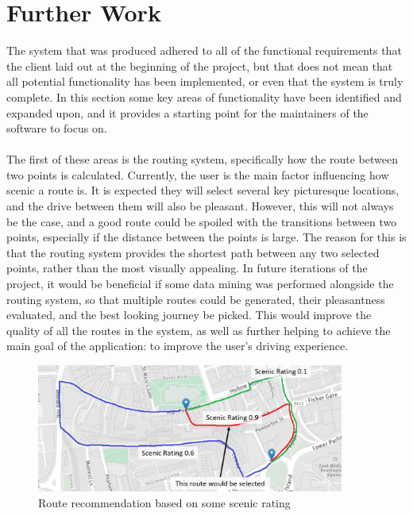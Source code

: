\section{Further Work}
The system that was produced adhered to all of the functional requirements that the client laid out at the beginning of the project, but that does not mean that all potential functionality has been implemented, or even that the system is truly complete. In this section some key areas of functionality have been identified and expanded upon, and it provides a starting point for the maintainers of the software to focus on.\ \\
\ \\
The first of these areas is the routing system, specifically how the route between two points is calculated. Currently, the user is the main factor influencing how scenic a route is. It is expected they will select several key picturesque locations, and the drive between them will also be pleasant. However, this will not always be the case, and a good route could be spoiled with the transitions between two points, especially if the distance between the points is large. The reason for this is that the routing system provides the shortest path between any two selected points, rather than the most visually appealing. In future iterations of the project, it would be beneficial if some data mining was performed alongside the routing system, so that multiple routes could be generated, their pleasantness evaluated, and the best looking journey be picked. This would improve the quality of all the routes in the system, as well as further helping to achieve the main goal of the application: to improve the user's driving experience.\ \\
\begin{figure}[!ht]
	\vspace{-3mm}
	\begin{center}
		\includegraphics[width=0.9\textwidth]{images/further/alt.png}
	\end{center}
	\vspace{-6mm}
	\caption{Route recommendation based on some scenic rating}	
\end{figure}

